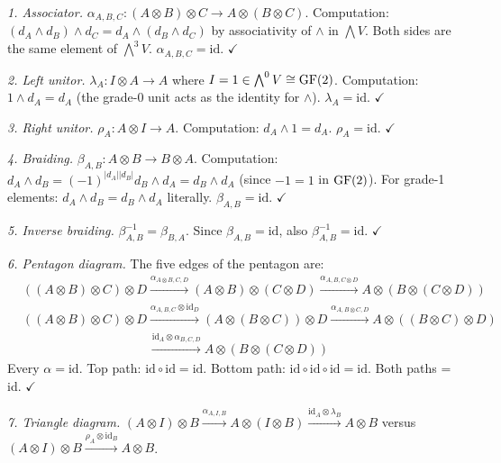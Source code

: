 \emph{1. Associator.}
$\alpha_{A,B,C}: (A \otimes B) \otimes C \to A \otimes
(B \otimes C)$.
Computation: $(d_A \wedge d_B) \wedge d_C = d_A \wedge
(d_B \wedge d_C)$ by associativity of $\wedge$ in
$\bigwedge V$. Both sides are the same element of
$\bigwedge^3 V$. $\alpha_{A,B,C} = \mathrm{id}$.
$\checkmark$

\emph{2. Left unitor.}
$\lambda_A: I \otimes A \to A$ where $I = 1 \in
\bigwedge^0 V \cong \operatorname{GF}(2)$.
Computation: $1 \wedge d_A = d_A$ (the grade-0 unit acts
as the identity for $\wedge$). $\lambda_A = \mathrm{id}$.
$\checkmark$

\emph{3. Right unitor.}
$\rho_A: A \otimes I \to A$.
Computation: $d_A \wedge 1 = d_A$. $\rho_A = \mathrm{id}$.
$\checkmark$

\emph{4. Braiding.}
$\beta_{A,B}: A \otimes B \to B \otimes A$.
Computation: $d_A \wedge d_B = (-1)^{|d_A||d_B|}
d_B \wedge d_A = d_B \wedge d_A$ (since $-1 = 1$ in
$\operatorname{GF}(2)$). For grade-1 elements:
$d_A \wedge d_B = d_B \wedge d_A$ literally.
$\beta_{A,B} = \mathrm{id}$. $\checkmark$

\emph{5. Inverse braiding.}
$\beta_{A,B}^{-1} = \beta_{B,A}$. Since
$\beta_{A,B} = \mathrm{id}$, also
$\beta_{A,B}^{-1} = \mathrm{id}$. $\checkmark$

\emph{6. Pentagon diagram.}
The five edges of the pentagon are:
\begin{align*}
  &((A \otimes B) \otimes C) \otimes D
    \xrightarrow{\alpha_{A \otimes B, C, D}}
  (A \otimes B) \otimes (C \otimes D)
    \xrightarrow{\alpha_{A, B, C \otimes D}}
  A \otimes (B \otimes (C \otimes D)) \\
  &((A \otimes B) \otimes C) \otimes D
    \xrightarrow{\alpha_{A,B,C} \otimes \mathrm{id}_D}
  (A \otimes (B \otimes C)) \otimes D
    \xrightarrow{\alpha_{A, B \otimes C, D}}
  A \otimes ((B \otimes C) \otimes D) \\
  &\qquad\qquad\qquad\qquad\qquad
    \xrightarrow{\mathrm{id}_A \otimes \alpha_{B,C,D}}
  A \otimes (B \otimes (C \otimes D))
\end{align*}
Every $\alpha = \mathrm{id}$. Top path:
$\mathrm{id} \circ \mathrm{id} = \mathrm{id}$.
Bottom path:
$\mathrm{id} \circ \mathrm{id} \circ \mathrm{id}
= \mathrm{id}$. Both paths = id. $\checkmark$

\emph{7. Triangle diagram.}
$(A \otimes I) \otimes B
\xrightarrow{\alpha_{A,I,B}}
A \otimes (I \otimes B)
\xrightarrow{\mathrm{id}_A \otimes \lambda_B}
A \otimes B$
versus
$(A \otimes I) \otimes B
\xrightarrow{\rho_A \otimes \mathrm{id}_B}
A \otimes B$.


